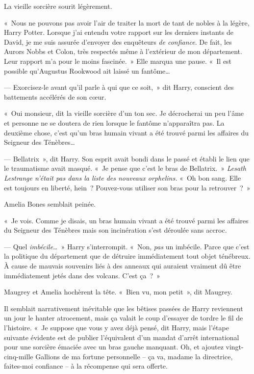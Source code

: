 La vieille sorcière sourit légèrement.

«~Nous ne pouvons pas avoir l'air de traiter la mort de tant de nobles à la légère, Harry Potter. Lorsque j'ai entendu votre rapport sur les derniers instants de David, je me suis assurée d'envoyer des enquêteurs \emph{de confiance}. De fait, les Aurors Nobbs et Colon, très respectés même à l'extérieur de mon département. Leur rapport m'a pour le moins fascinée.~» Elle marqua une pause. «~Il est possible qu'Augustus Rookwood ait laissé un fantôme…

--- Exorcisez-le avant qu'il parle à qui que ce soit,~» dit Harry, conscient des battements accélérés de son cœur.

«~Oui monsieur, dit la vieille sorcière d'un ton sec. Je décrocherai un peu l'âme et personne ne se doutera de rien lorsque le fantôme n'apparaîtra pas. La deuxième chose, c'est qu'un bras humain vivant a été trouvé parmi les affaires du Seigneur des Ténèbres…

--- Bellatrix~», dit Harry. Son esprit avait bondi dans le passé et établi le lien que le traumatisme avait masqué. «~Je pense que c'est le bras de Bellatrix.~» \emph{Lesath Lestrange n'était pas dans la liste des nouveaux orphelins.} «~Oh bon sang. Elle est toujours en liberté, hein~? Pouvez-vous utiliser son bras pour la retrouver~?~»

Amelia Bones semblait peinée.

«~Je vois. Comme je disais, un bras humain vivant a été trouvé parmi les affaires du Seigneur des Ténèbres mais son incinération s'est déroulée sans accroc.

--- Quel \emph{imbécile}…~» Harry s'interrompit. «~Non, \emph{pas} un imbécile. Parce que c'est la politique du département que de détruire immédiatement tout objet ténébreux. À cause de mauvais souvenirs liés à des anneaux qui auraient vraiment dû être immédiatement jetés dans des volcans. C'est ça~?~»

Maugrey et Amelia hochèrent la tête. «~Bien vu, mon petit~», dit Maugrey.

Il semblait narrativement inévitable que les bêtises passées de Harry reviennent un jour le hanter atrocement, mais ça valait le coup d'essayer de tordre le fil de l'histoire. «~Je suppose que vous y avez déjà pensé, dit Harry, mais l'étape suivante évidente est de publier l'équivalent d'un mandat d'arrêt international pour une sorcière émaciée avec un bras gauche manquant. Oh, et ajoutez vingt-cinq-mille Gallions de ma fortune personnelle -- ça va, madame la directrice, faites-moi confiance -- à la récompense qui sera offerte.

